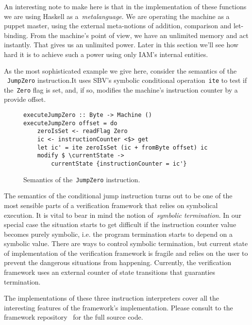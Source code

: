 An interesting note to make here is that in the implementation of these functions
we are using Haskell as a~\emph{metalanguage}. We are operating the machine as
a puppet master, using the external meta-notions of addition, comparison and let-binding.
From the machine's point of view, we have an unlimited memory and act instantly.
That gives us an unlimited power. Later in this section we'll see how hard it is
to achieve such a power using only IAM's internal entities.

As the most sophisticated example we give here, consider the semantics of the
~\texttt{JumpZero} instruction.It uses SBV's symbolic conditional
operation~\texttt{ite} to test if the~\texttt{Zero} flag
is set, and, if so, modifies the machine's instruction counter by a provide offset.

\begin{figure}[H]
\begin{verbatim}
executeJumpZero :: Byte -> Machine ()
executeJumpZero offset = do
    zeroIsSet <- readFlag Zero
    ic <- instructionCounter <$> get
    let ic' = ite zeroIsSet (ic + fromByte offset) ic
    modify $ \currentState ->
        currentState {instructionCounter = ic'}
\end{verbatim}
\caption{Semantics of the~\texttt{JumpZero} instruction.}
\label{jumpZeroSemantics}
\end{figure}

The semantics of the conditional jump instruction turns out to be one of the
most sensible parts of a verification framework that relies on symbolical execution.
It is vital to bear in mind the notion of~\emph{symbolic termination}. In our special
case the situation starts to get difficult if the instruction counter value becomes
purely symbolic, i.e. the program termination starts to depend on a symbolic value.
There are ways to control symbolic termination, but current state of implementation of
the verification framework is fragile and relies on the user to prevent the dangerous
situations from happening. Currently, the verification framework uses an external
counter of state transitions that guaranties termination.

The implementations of these three instruction interpreters cover all the interesting
features of the framework's implementation. Please consult to the framework
repository~\cite{IAMGithub} for the full source code.
